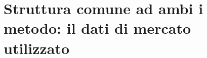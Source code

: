 \documentclass[11pt,a4paper]{article}
\theoremstyle{plain}
\theoremstyle{definition}
\theoremstyle{remark}
\newcommand{\UFR}{\mathrm{UFR}}
\newcommand{\FSP}{\mathrm{FSP}}
\begin{document}
%
%
%
%

\section{Struttura comune ad ambi i metodo: il dati di mercato utilizzato}
\end{document}
